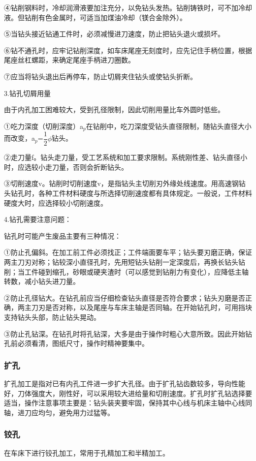 \documentclass{ctexbook}
\begin{document}
④钻削钢料时，冷却润滑液要加注充分，以免钻头发热。钻削铸铁时，可不加冷却液。但钻削有色金属时，可适当加煤油冷却（镁合金除外）。

⑤当钻头接近钻通工件时，必须减慢进刀速度，防止把钻头退火或损坏。

⑥钻不通孔时，应牢记钻削深度，如车床尾座无刻度时，应先记住手柄位置，根据尾座丝杠螺距，来确定尾座手柄进刀圈数。

⑦应当将钻头退出后再停车，防止切屑夹住钻头或使钻头折断。

3.钻孔切屑用量

由于内孔加工困难较大，受到孔径限制，因此切削用量比车外圆时低些。

①吃力深度（切削深度）a$_p$在钻削中，吃刀深度受钻头直径限制，随钻头直径大小而改变，a$_p$=$\dfrac{1}{2}\phi$钻头。

②走刀量f。钻头走刀量，受工艺系统和加工要求限制。系统刚性差、钻头直径小时，应选较小走刀量，否则会折断钻头。

③切削速度v。钻削时切削速度v，是指钻头主切削刃外缘处线速度。用高速钢钻头钻孔时，各种工件材料硬度与所选择切削速度都有具体规定。一般说，工件材料硬度大时，应选择较小切削速度。

4.钻孔需要注意问题：

钻孔时可能产生废品主要有三种情况：

①防止孔偏斜。在加工前工件必须找正；工件端面要车平；钻头要刃磨正确，保证两主刀刃对称；钻较深小直径孔时，先用短钻头钻削一定深度后，再换长钻头钻削；当工件碰到缩孔，砂眼或硬夹渣时（可以感觉到钻削力有变化），应降低主轴转数，减小钻头进刀量。

②防止孔径钻大。在钻孔前应当仔细检查钻头直径是否符合要求；钻头刃磨是否正确，两主刀刃是否对称，以及尾座与车床主轴是否同轴。在开始钻孔时，可用挡块支持钻头头部，防止钻头晃动。

③防止孔钻深。在钻孔时将孔钻深，大多是由于操作时粗心大意所致。因此开始钻孔前必须看清，图纸尺寸，操作时精神要集中。
\subsubsection{扩孔}
扩孔加工是指对已有内孔工件进一步扩大孔径。由于扩孔钻齿数较多，导向性能好，刀体强度大，刚性好，可以采用较大进给量和切削速度。扩孔时扩孔钻选择要适当，操作注意事项主要是：钻头装夹要牢固，保持其中心线与机床主轴中心线同轴，进刀应均匀，避免用力过猛等。
\subsubsection{铰孔}
在车床下进行铰孔加工，常用于孔精加工和半精加工。
\end{document}
